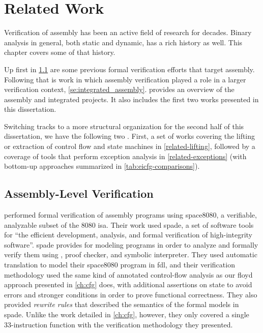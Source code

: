\chapter{Related Work}\label{ch:related}
Verification of assembly has been an active field of research for decades.
Binary analysis in general, both static and dynamic, has a rich history as well.
This chapter covers some of that history.

Up first in \cref{se:previous_assembly}
are some previous formal verification efforts that target assembly.
Following that is work in which assembly verification played a role
in a larger verification context, \cref{se:integrated_assembly}.
 provides an overview of the assembly
and integrated projects.
It also includes the first two works presented in this dissertation.

Switching tracks to a more structural organization for the second half of this dissertation, we have the following two .
First, a set of works covering the lifting or extraction of control flow and state machines in \cref{related-lifting}, followed by a coverage of tools that perform exception analysis in \cref{related-exceptions} (with bottom-up approaches summarized in \cref{tab:eicfg-comparisons}).

\section{Assembly-Level Verification}\label{se:previous_assembly}
\Textcite{clutterbuck1986validation,clutterbuck1988verification} performed formal verification
of assembly programs using \gls{space8080}, a verifiable,
analyzable subset of the \gls{8080} \ac{isa}.
Their work used \ac{spade}, %
a set of software tools for ``the efficient development, analysis, and formal verification of high-integrity software''.
\Ac{spade} provides  for modeling programs
in order to analyze and formally verify them
using , proof checker, and symbolic interpreter.
They used automatic translation to model their \gls{space8080} program
in \ac{fdl}, and their verification methodology used the same kind of
annotated control-flow analysis as our \gls{floyd} approach
presented in \cref{ch:cfg} does, with additional assertions on state to avoid errors
and stronger conditions in order to prove functional correctness.
They also provided \emph{rewrite rules} that described the semantics
of the formal models in \ac{spade}. Unlike the work detailed in \cref{ch:cfg}, however,
they only covered a single 33-instruction function
with the verification methodology they presented.

